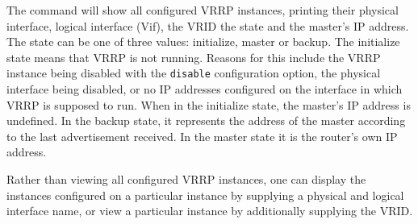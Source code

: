 \vspace{0.1in}
\noindent{}
\vspace{0.1in}

The command will show all configured VRRP instances, printing their physical
interface, logical interface (Vif), the VRID the state and the master's IP
address.  The state can be one of three values: initialize, master or backup.
The initialize state means that VRRP is not running.  Reasons for this include
the VRRP instance being disabled with the {\tt disable} configuration option,
the physical interface being disabled, or no IP addresses configured on the
interface in which VRRP is supposed to run.  When in the initialize state, the
master's IP address is undefined.  In the backup state, it represents the
address of the master according to the last advertisement received.  In the
master state it is the router's own IP address.

Rather than viewing all configured VRRP instances, one can display the instances
configured on a particular instance by supplying a physical and logical interface
name, or view a particular instance by additionally supplying the VRID.

